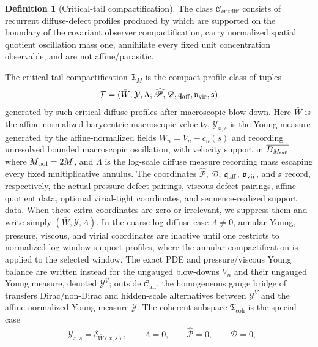 \documentclass[11pt]{amsart}
\numberwithin{equation}{section}
\theoremstyle{plain}
\theoremstyle{definition}
\newtheorem{definition}[definition]{Definition}
\theoremstyle{remark}
\newcommand{\Caff}{\mathcal C_{\mathrm{aff}}}
\newcommand{\Ccritdiff}{\mathcal C_{\mathrm{critdiff}}}
\newcommand{\Tcrit}{\mathfrak T_M}
\newcommand{\Tcoh}{\mathfrak T_{\mathrm{coh}}}
\begin{document}
\begin{definition}[Critical-tail compactification]
\label{def:critical-diffuse-tail-strata}
The class \(\Ccritdiff\) consists of recurrent diffuse-defect profiles produced
by  which are supported on the boundary of
the covariant observer compactification, carry normalized spatial quotient oscillation
mass one, annihilate every fixed unit concentration observable, and are not
affine/parasitic.

The critical-tail compactification \(\Tcrit\) is the compact profile class of
tuples
\[
   \mathcal T=
   (\bar W,\mathcal Y,\Lambda;
    \widehat{\mathscr P},\mathscr D,
    \mathfrak q_{\rm aff},\mathfrak v_{\rm vir},\mathfrak s)
\]
generated by such critical diffuse profiles after macroscopic blow-down.  Here
\(\bar W\) is the affine-normalized barycentric macroscopic velocity,
\(\mathcal Y_{x,s}\) is the Young measure generated by the affine-normalized
fields \(W_n=V_n-c_n(s)\) and recording unresolved bounded macroscopic
oscillation, with velocity support in \(\overline{B_{M_{\rm tail}}}\) where
\(M_{\rm tail}=2M\), and
\(\Lambda\) is the log-scale diffuse measure recording mass escaping every fixed
multiplicative annulus.  The coordinates
\(\widehat{\mathscr P}\), \(\mathscr D\), \(\mathfrak q_{\rm aff}\),
\(\mathfrak v_{\rm vir}\), and \(\mathfrak s\) record, respectively, the actual
pressure-defect pairings, viscous-defect pairings, affine quotient data, optional
virial-tight coordinates, and sequence-realized support data.  When these extra
coordinates are zero or irrelevant, we suppress them and write simply
\((\bar W,\mathcal Y,\Lambda)\).  In the coarse log-diffuse case
\(\Lambda\ne0\), annular Young, pressure, viscous, and virial coordinates are
inactive until one restricts to normalized log-window support profiles, where
the annular compactification is applied to the selected window.  The exact PDE
and pressure/viscous Young balance are
written instead for the ungauged blow-downs \(V_n\) and their ungauged Young
measure, denoted \(\mathcal Y^V\); outside \(\Caff\), the homogeneous gauge
bridge of  transfers
Dirac/non-Dirac and hidden-scale alternatives between \(\mathcal Y^V\) and the
affine-normalized Young measure \(\mathcal Y\).  The coherent subspace
\(\Tcoh\) is the special case
\[
\begin{aligned}
   &\mathcal Y_{x,s}=\delta_{\bar W(x,s)},\qquad
   \Lambda=0,\qquad
   \widehat{\mathscr P}=0,\qquad
   \mathscr D=0,\\

\end{aligned}\]
\end{definition}
\end{document}
